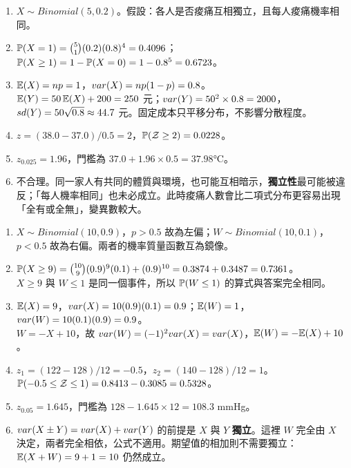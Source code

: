 
\renewcommand{\chapterlabel}{第 4 章\ 隨機變數與機率分布}
\newcommand{\handoutkind}{課堂分組練習\ 參考解答}

\newenvironment{answers}{\begin{enumerate}[leftmargin=*, label=\textbf{\arabic*.}, itemsep=6pt]}{\end{enumerate}}



\begin{answers}
    \item $X \sim Binomial(5, 0.2)$。假設：各人是否痠痛互相獨立，且每人痠痛機率相同。
    \item $\mathbb{P}(X=1) = \binom{5}{1}(0.2)(0.8)^4 = 0.4096$；\quad $\mathbb{P}(X\ge 1) = 1 - \mathbb{P}(X=0) = 1-0.8^5 = 0.6723$。
    \item $\mathbb{E}(X) = np = 1$，$var(X) = np(1-p) = 0.8$。\\
          $\mathbb{E}(Y) = 50\,\mathbb{E}(X) + 200 = 250$ 元；$var(Y) = 50^2 \times 0.8 = 2000$，$sd(Y) = 50\sqrt{0.8} \approx 44.7$ 元。固定成本只平移分布，不影響分散程度。
    \item $z = (38.0-37.0)/0.5 = 2$，$\mathbb{P}(\mathcal{Z} \ge 2) = 0.0228$。
    \item $z_{0.025} = 1.96$，門檻為 $37.0 + 1.96 \times 0.5 = 37.98$°C。
    \item 不合理。同一家人有共同的體質與環境，也可能互相暗示，\textbf{獨立性}最可能被違反；「每人機率相同」也未必成立。此時痠痛人數會比二項式分布更容易出現「全有或全無」，變異數較大。
\end{answers}
\newpage

\begin{answers}
    \item $X \sim Binomial(10, 0.9)$，$p>0.5$ 故為左偏；$W \sim Binomial(10, 0.1)$，$p<0.5$ 故為右偏。兩者的機率質量函數互為鏡像。
    \item $\mathbb{P}(X \ge 9) = \binom{10}{9}(0.9)^9(0.1) + (0.9)^{10} = 0.3874 + 0.3487 = 0.7361$。\\
          $X \ge 9$ 與 $W \le 1$ 是同一個事件，所以 $\mathbb{P}(W \le 1)$ 的算式與答案完全相同。
    \item $\mathbb{E}(X) = 9$，$var(X) = 10(0.9)(0.1) = 0.9$；$\mathbb{E}(W) = 1$，$var(W) = 10(0.1)(0.9) = 0.9$。\\
          $W = -X + 10$，故 $var(W) = (-1)^2var(X) = var(X)$，$\mathbb{E}(W) = -\mathbb{E}(X) + 10$。
    \item $z_1 = (122-128)/12 = -0.5$，$z_2 = (140-128)/12 = 1$。\\
          $\mathbb{P}(-0.5 \le \mathcal{Z} \le 1) = 0.8413 - 0.3085 = 0.5328$。
    \item $z_{0.05} = 1.645$，門檻為 $128 - 1.645 \times 12 = 108.3$ mmHg。
    \item $var(X \pm Y) = var(X) + var(Y)$ 的前提是 $X$ 與 $Y$ \textbf{獨立}。這裡 $W$ 完全由 $X$ 決定，兩者完全相依，公式不適用。期望值的相加則不需要獨立：$\mathbb{E}(X+W) = 9 + 1 = 10$ 仍然成立。
\end{answers}
\newpage

